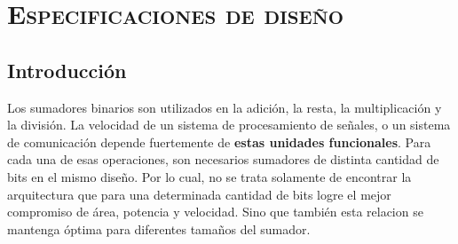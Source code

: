 





\chapter{ \textsc{ Especificaciones de diseño} }\label{chap:especificaciones}

\section{Introducción}\label{sec:intro_esp}
Los sumadores binarios son utilizados en la adición, la resta, la multiplicación y la división. La velocidad de un sistema de procesamiento de señales, o un sistema de comunicación depende fuertemente de \textbf{estas unidades funcionales\cite{rabaey2003}}. Para cada una de esas operaciones, son necesarios sumadores de distinta cantidad de bits en el mismo diseño. Por lo cual, no se trata solamente de encontrar la arquitectura que para una determinada cantidad de bits logre el mejor compromiso de área, potencia y velocidad. Sino que también esta relacion se mantenga óptima para diferentes tamaños del sumador. 

